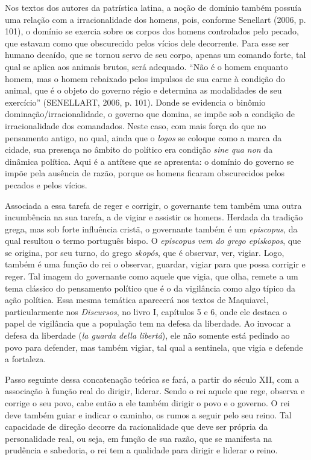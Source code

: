 Nos textos dos autores da patrística latina, a noção de domínio também
possuía uma relação com a irracionalidade dos homens, pois, conforme
Senellart (2006, p. 101), o domínio se exercia sobre os corpos dos
homens controlados pelo pecado, que estavam como que obscurecido pelos
vícios dele decorrente. Para esse ser humano decaído, que se tornou
servo de seu corpo, apenas um comando forte, tal qual se aplica aos
animais brutos, será adequado. ``Não é o homem enquanto homem, mas o
homem rebaixado pelos impulsos de sua carne à condição do animal, que é
o objeto do governo régio e determina as modalidades de seu exercício''
(SENELLART, 2006, p. 101). Donde se evidencia o binômio
dominação/irracionalidade, o governo que domina, se impõe sob a condição
de irracionalidade dos comandados. Neste caso, com mais força do que no
pensamento antigo, no qual, ainda que o \emph{logos} se coloque como a
marca da cidade, sua presença no âmbito do político era condição
\emph{sine qua non} da dinâmica política. Aqui é a antítese que se
apresenta: o domínio do governo se impõe pela ausência de razão, porque
os homens ficaram obscurecidos pelos pecados e pelos vícios.

Associada a essa tarefa de reger e corrigir, o governante tem também uma
outra incumbência na sua tarefa, a de vigiar e assistir os homens.
Herdada da tradição grega, mas sob forte influência cristã, o governante
também é um \emph{episcopus}, da qual resultou o termo português bispo.
O \emph{episcopus vem do grego episkopos}, que se origina, por seu
turno, do grego \emph{skopós}, que é observar, ver, vigiar. Logo, também
é uma função do rei o observar, guardar, vigiar para que possa corrigir
e reger. Tal imagem do governante como aquele que vigia, que olha,
remete a um tema clássico do pensamento político que é o da vigilância
como algo típico da ação política. Essa mesma temática aparecerá nos
textos de Maquiavel, particularmente nos \emph{Discursos}, no livro I,
capítulos 5 e 6, onde ele destaca o papel de vigilância que a população
tem na defesa da liberdade. Ao invocar a defesa da liberdade (\emph{la
guarda della libertá}), ele não somente está pedindo ao povo para
defender, mas também vigiar, tal qual a sentinela, que vigia e defende a
fortaleza.

Passo seguinte dessa concatenação teórica se fará, a partir do século
XII, com a associação à função real do dirigir, liderar. Sendo o rei
aquele que rege, observa e corrige o seu povo, cabe então a ele também
dirigir o povo e o governo. O rei deve também guiar e indicar o caminho,
os rumos a seguir pelo seu reino. Tal capacidade de direção decorre da
racionalidade que deve ser própria da personalidade real, ou seja, em
função de sua razão, que se manifesta na prudência e sabedoria, o rei
tem a qualidade para dirigir e liderar o reino.

